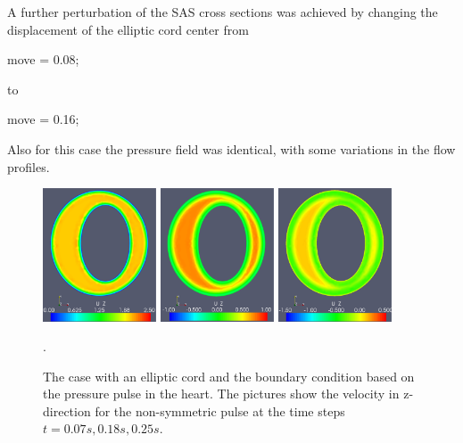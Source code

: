 A further perturbation of the SAS cross sections was achieved by changing the displacement of the elliptic cord center from
\begin{bash}
move = 0.08;
\end{bash}
to
\begin{bash}
move = 0.16;
\end{bash}
Also for this case the pressure field was identical, with some variations in the flow profiles.



\begin{figure}\begin{center}
\includegraphics[width=0.3\textwidth]{chapters/hentschel/pdf/pulse_f1_08_elliptic_sysmax_nmb7.pdf}
\includegraphics[width=0.3\textwidth]{chapters/hentschel/pdf/pulse_f1_08_elliptic_sysdia_nmb18.pdf}
\includegraphics[width=0.3\textwidth]{chapters/hentschel/pdf/pulse_f1_08_elliptic_diamin1_nmb25.pdf}
\caption{The case with an elliptic cord and the boundary condition based on
the pressure pulse in the heart. The pictures show the velocity in z-direction for the non-symmetric pulse at 
the time steps $t=0.07s, 0.18s, 0.25s$.}
\label{fig:case3}.
\end{center}\end{figure}



